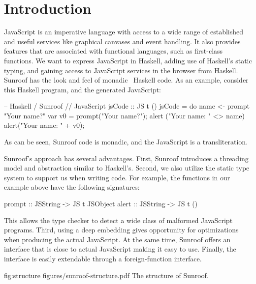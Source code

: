  
\section{Introduction}

JavaScript is an imperative language with access to a wide range
of established and useful services like graphical canvases and event
handling. It also provides features that are associated with 
functional languages, such as first-class functions. 
We want to express JavaScript in Haskell, adding use
of Haskell's static typing, and gaining access to JavaScript services
in the browser from Haskell.
%
Sunroof has the look and feel of monadic~\cite{Moggi:91:ComputationMonads} Haskell code. As an example,
consider this Haskell program, and the generated JavaScript:

\noindent
\begin{Code}
-- Haskell / Sunroof                 // JavaScript
jsCode :: JS t ()
jsCode = do
   name <- prompt "Your name?"       var v0 = prompt("Your name?"); 
   alert ("Your name: " <> name)     alert("Your name: " + v0);
\end{Code}%
As can be seen, Sunroof code is monadic, and the JavaScript is a transliteration.

Sunroof's approach has several advantages. 
First,
Sunroof introduces a threading model and abstraction similar
to Haskell's. 
Second, we also utilize the static type system to support us when 
writing code. For example, the functions
in our example above have the following signatures:
\begin{Code}
prompt :: JSString -> JS t JSObject
alert  :: JSString -> JS t ()
\end{Code}
This allows the type checker to detect a wide class
of malformed JavaScript programs.
Third, using a deep embedding gives opportunity 
for optimizations when producing the actual JavaScript.
At the same time, Sunroof offers an interface that is 
close to actual JavaScript making it easy to use.
Finally, the interface is easily extendable through
a foreign-function interface.

\Figure%
{fig:structure}%
{figures/sunroof-structure.pdf}%
{The structure of Sunroof.}

